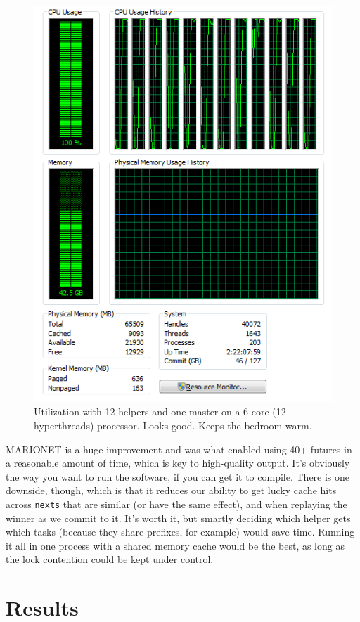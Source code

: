 \documentclass[twocolumn]{article}
\begin{document}
\begin{figure}[htb]
\begin{center}
\includegraphics[width=0.75 \linewidth]{utilization}
\end{center}\vspace{-0.1in}
\caption{Utilization with 12 helpers and one master on a 6-core (12
  hyperthreads) processor. Looks good. Keeps the bedroom warm.}
\label{fig:utilization}
\end{figure}

MARIONET is a huge improvement and was what enabled using 40+ futures
in a reasonable amount of time, which is key to high-quality output. It's
obviously the way you want to run the software, if you can get it to
compile. There is one downside, though, which is that it reduces our
ability to get lucky cache hits across {\tt nexts} that are similar (or
have the same effect), and when replaying the winner as we commit to it.
It's worth it, but smartly deciding which helper gets which tasks (because
they share prefixes, for example) would save time. Running it all in one
process with a shared memory cache would be the best, as long as the
lock contention could be kept under control.

\section{Results} \label{sec:results}
\end{document}
